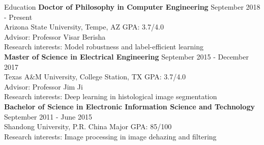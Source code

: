 \documentclass{resume} %
\begin{document}
  

\vspace{-0.3cm}
\begin{rSection}{Education}
{\bf Doctor of Philosophy in Computer Engineering} \hfill {September 2018 - Present}
\\
Arizona State University, Tempe, AZ \hspace{0.1in}GPA: 3.7/4.0\\
Advisor: Professor Visar Berisha\\
Research interests: Model robustness and label-efficient learning \\ 
{\bf Master of Science in Electrical Engineering} \hfill {September 2015 - December 2017}
\\ 
Texas A\&M University, College Station, TX \hspace{0.1in}GPA: 3.7/4.0
\\
Advisor: Professor Jim Ji\\
Research interests: Deep learning in histological image segmentation\\
{\bf Bachelor of Science in Electronic Information Science and Technology} \hfill {September 2011 - June 2015}
\\ 
Shandong University, P.R. China \hspace{0.1in}Major GPA: 85/100\\ 
Research interests:  Image processing in image dehazing and filtering 
\end{rSection} 
\vspace{-0.1cm}
\end{document}
